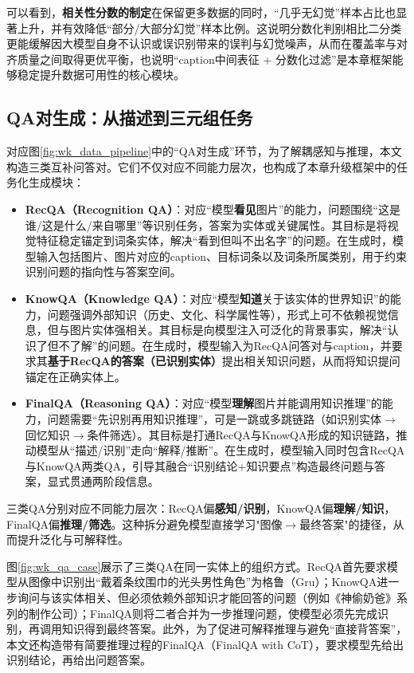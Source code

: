 可以看到，\textbf{相关性分数的制定}在保留更多数据的同时，“几乎无幻觉”样本占比也显著上升，并有效降低“部分/大部分幻觉”样本比例。这说明分数化判别相比二分类更能缓解因大模型自身不认识或误识别带来的误判与幻觉噪声，从而在覆盖率与对齐质量之间取得更优平衡，也说明“caption中间表征 + 分数化过滤”是本章框架能够稳定提升数据可用性的核心模块。

\subsection{QA对生成：从描述到三元组任务}
对应图\ref{fig:wk_data_pipeline}中的“QA对生成”环节，为了解耦感知与推理，本文构造三类互补问答对。它们不仅对应不同能力层次，也构成了本章升级框架中的任务化生成模块：
\begin{itemize}
  \item \textbf{RecQA（Recognition QA）}：对应“模型\textbf{看见}图片”的能力，问题围绕“这是谁/这是什么/来自哪里”等识别任务，答案为实体或关键属性。其目标是将视觉特征稳定锚定到词条实体，解决“看到但叫不出名字”的问题。在生成时，模型输入包括图片、图片对应的caption、目标词条以及词条所属类别，用于约束识别问题的指向性与答案空间。
  \item \textbf{KnowQA（Knowledge QA）}：对应“模型\textbf{知道}关于该实体的世界知识”的能力，问题强调外部知识（历史、文化、科学属性等），形式上可不依赖视觉信息，但与图片实体强相关。其目标是向模型注入可泛化的背景事实，解决“认识了但不了解”的问题。在生成时，模型输入为RecQA问答对与caption，并要求其\textbf{基于RecQA的答案（已识别实体）}提出相关知识问题，从而将知识提问锚定在正确实体上。
  \item \textbf{FinalQA（Reasoning QA）}：对应“模型\textbf{理解}图片并能调用知识推理”的能力，问题需要“先识别再用知识推理”，可是一跳或多跳链路（如识别实体$\rightarrow$回忆知识$\rightarrow$条件筛选）。其目标是打通RecQA与KnowQA形成的知识链路，推动模型从“描述/识别”走向“解释/推断”。在生成时，模型输入同时包含RecQA与KnowQA两类QA，引导其融合“识别结论+知识要点”构造最终问题与答案，显式贯通两阶段信息。
\end{itemize}

三类QA分别对应不同能力层次：RecQA偏\textbf{感知/识别}，KnowQA偏\textbf{理解/知识}，FinalQA偏\textbf{推理/筛选}。这种拆分避免模型直接学习"图像$\rightarrow$最终答案"的捷径，从而提升泛化与可解释性。

图\ref{fig:wk_qa_case}展示了三类QA在同一实体上的组织方式。RecQA首先要求模型从图像中识别出“戴着条纹围巾的光头男性角色”为格鲁（Gru）；KnowQA进一步询问与该实体相关、但必须依赖外部知识才能回答的问题（例如《神偷奶爸》系列的制作公司）；FinalQA则将二者合并为一步推理问题，使模型必须先完成识别，再调用知识得到最终答案。此外，为了促进可解释推理与避免“直接背答案”，本文还构造带有简要推理过程的FinalQA（FinalQA with CoT），要求模型先给出识别结论，再给出问题答案。

